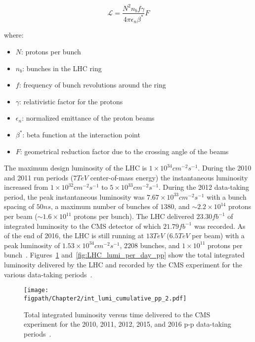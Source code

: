 \begin{equation}
\mathcal{L}=\frac{N^{2}n_{b}f\gamma}{4\pi\epsilon_{n}\beta^{*}}F
\label{eq:luminosity}
\end{equation}

where:

\begin{itemize}
	\item $N$: protons per bunch
	\item $n_{b}$: bunches in the LHC ring
	\item $f$: frequency of bunch revolutions around the ring 
	\item $\gamma$: relativistic factor for the protons
	\item $\epsilon_{n}$: normalized emittance of the proton beams
	\item $\beta^{*}$: beta function at the interaction point
	\item $F$: geometrical reduction factor due to the crossing angle of the beams
\end{itemize}

The maximum design luminosity of the LHC is $1{\times}10^{34}\unit{cm^{-2}s^{-1}}$. During the 2010 and 2011 run periods ($7\unit{TeV}$ center-of-mass energy) the instantaneous luminosity increased from $1{\times}10^{32}\unit{cm^{-2}s^{-1}}$ to $5{\times}10^{33}\unit{cm^{-2}s^{-1}}$. During the 2012 data-taking period, the peak instantaneous luminosity was $7.67{\times}10^{33}\unit{cm^{-2}s^{-1}}$ with a bunch spacing of $50\unit{ns}$, a maximum number of bunches of $1380$, and $\sim2.2{\times}10^{14}$ protons per beam ($\sim1.6{\times}10^{11}$ protons per bunch). The LHC delivered $23.30\unit{fb^{-1}}$ of integrated luminosity to the CMS detector of which $21.79\unit{fb^{-1}}$ was recorded. As of the end of 2016, the LHC is still running at $13\unit{TeV}$ ($6.5\unit{TeV}$ per beam) with a peak luminosity of $1.53{\times}10^{34}\unit{cm^{-2}s^{-1}}$, $2208$ bunches, and $1{\times}10^{11}$ protons per bunch~\cite{CMSWebBasedMonitoring,LumiPublic}. Figures~\ref{fig:LHC_int_lumi_pp} and~\ref{fig:LHC_lumi_per_day_pp} show the total integrated luminosity delivered by the LHC and recorded by the CMS experiment for the various data-taking periods~\cite{LumiPublic}.

\begin{figure}[!hbt]
	\centering
	\texttt{[image: \\figpath/Chapter2/int\_lumi\_cumulative\_pp\_2.pdf]}
	\caption{Total integrated luminosity versus time delivered to the CMS experiment for the 2010, 2011, 2012, 2015, and 2016 p-p data-taking periods~\cite{LumiPublic}.}
	\label{fig:LHC_int_lumi_pp}
\end{figure}

